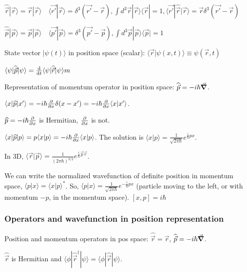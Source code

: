$\widehat{\vec{r}} | \vec{r} \rangle = \vec{r} | \vec{r} \rangle \quad \langle \vec{r'} | \vec{r} \rangle = \delta^3 (\vec{r'} - \vec{r}), \int d^3 \vec{r} |\vec{r} \rangle \langle \vec{r} | = 1, \langle \vec{r'} | \hat{\vec{r}} | \vec{r} \rangle = \vec{r} \delta^3(\vec{r'} - \vec{r})$

$\widehat{\vec{p}} | \vec{p} \rangle = \vec{p} | \vec{p} \rangle \quad \langle \vec{p'} | \vec{p} \rangle = \delta^3(\vec{p'} - \vec{p}), \int d^3 \vec{p} | \vec{p} \rangle \langle \vec{p} | = 1$

State vector $| \psi(t) \rangle$ in position space (scalar): $\langle \vec{r} | \psi(x, t) \rangle \equiv \psi(\vec{r}, t)$

$\langle \psi | \widehat{\vec{p}} | \psi \rangle = \dv{}{t} \langle \psi | \widehat{\vec{r}} | \psi \rangle m$

Representation of momentum operator in position space: $\widehat{\vec{p}} = -i \hbar \vec{\grad}$.

$\langle x | \widehat{p} | x' \rangle = -i \hbar \pdv{}{x} \delta(x - x') = -i \hbar \pdv{}{x} \langle x | x' \rangle$.

$\widehat{p} = -i \hbar \pdv{}{x}$ is Hermitian, $\pdv{}{x}$ is not.

$\langle x | \widehat{p} | p \rangle = p \langle x | p \rangle = -i \hbar \pdv{}{x} \langle x | p \rangle$. The solution is $\langle x | p \rangle = \frac{1}{\sqrt{2 \pi \hbar}} e^{\frac{i}{\hbar} px}$. 

In 3D, $\langle \vec{r} | \vec{p} \rangle = \frac{1}{(2 \pi \hbar)^{3/2}} e^{\frac{i}{\hbar} \vec{p} \vec{r}}$.

We can write the normalized wavefunction of definite position in momentum space, $\langle p | x \rangle = \langle x | p \rangle^*$. So, $\langle p | x \rangle = \frac{1}{\sqrt{2 \pi \hbar}} e^{-\frac{i}{\hbar} px}$ (particle moving to the left, or with momentum $-p$, in the momentum space).
$[x, p] = i \hbar$

\subsubsection{Operators and wavefunction in position representation}

Position and momentum operators in pos space: $\widehat{\vec{r}} = \vec{r}$, $\widehat{\vec{p}} = -i \hbar \vec{\grad}$.

$\widehat{\vec{r}}$ is Hermitian and $\langle \phi | \widehat{\vec{r}}^{\dag} | \psi \rangle = \langle \phi | \widehat{\vec{r}} | \psi \rangle$.

